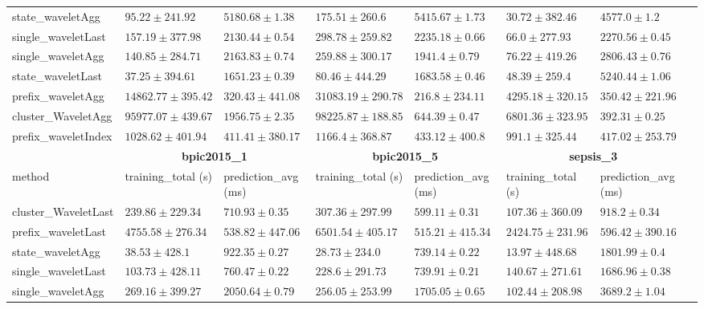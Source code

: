 \documentclass[twoside,11pt]{Latex/Classes/PhDthesisPSnPDF}
\begin{document}
\begin{table}[h]
{\begin{tabular}{llllllll}
	state\_waveletAgg & $95.22 \pm 241.92$ & $5180.68 \pm 1.38$ & $175.51 \pm 260.6$ & $5415.67 \pm 1.73$ & $\mathbf{30.72 \pm 382.46}$ & $4577.0 \pm 1.2$ \\ 
	single\_waveletLast & $157.19 \pm 377.98$ & $2130.44 \pm 0.54$ & $298.78 \pm 259.82$ & $2235.18 \pm 0.66$ & $66.0 \pm 277.93$ & $2270.56 \pm 0.45$ \\ 
	single\_waveletAgg & $140.85 \pm 284.71$ & $2163.83 \pm 0.74$ & $259.88 \pm 300.17$ & $1941.4 \pm 0.79$ & $76.22 \pm 419.26$ & $2806.43 \pm 0.76$ \\ 
	state\_waveletLast & $\mathbf{37.25 \pm 394.61}$ & $1651.23 \pm 0.39$ & $\mathbf{80.46 \pm 444.29}$ & $1683.58 \pm 0.46$ & $48.39 \pm 259.4$ & $5240.44 \pm 1.06$ \\ 
	prefix\_waveletAgg & $14862.77 \pm 395.42$ & $\mathbf{320.43 \pm 441.08}$ & $31083.19 \pm 290.78$ & $\mathbf{216.8 \pm 234.11}$ & $4295.18 \pm 320.15$ & $350.42 \pm 221.96$ \\ 
	cluster\_WaveletAgg & $95977.07 \pm 439.67$ & $1956.75 \pm 2.35$ & $98225.87 \pm 188.85$ & $644.39 \pm 0.47$ & $6801.36 \pm 323.95$ & $392.31 \pm 0.25$ \\ 
	prefix\_waveletIndex & $1028.62 \pm 401.94$ & $411.41 \pm 380.17$ & $1166.4 \pm 368.87$ & $433.12 \pm 400.8$ & $991.1 \pm 325.44$ & $417.02 \pm 253.79$ \\ 
	\bottomrule
	\toprule
	& \multicolumn{2}{c}{{\bfseries bpic2015\_1}} & \multicolumn{2}{c}{{\bfseries bpic2015\_5}} & \multicolumn{2}{c}{{\bfseries sepsis\_3}} \\ \cmidrule(lr){2-3} \cmidrule(lr){4-5} \cmidrule(lr){6-7}
	method  & training\_total (s) & prediction\_avg (ms) & training\_total (s) & prediction\_avg (ms) & training\_total (s) & prediction\_avg (ms) \\ \midrule
	cluster\_WaveletLast & $239.86 \pm 229.34$ & $710.93 \pm 0.35$ & $307.36 \pm 297.99$ & $599.11 \pm 0.31$ & $107.36 \pm 360.09$ & $918.2 \pm 0.34$ \\ 
	prefix\_waveletLast & $4755.58 \pm 276.34$ & $538.82 \pm 447.06$ & $6501.54 \pm 405.17$ & $515.21 \pm 415.34$ & $2424.75 \pm 231.96$ & $596.42 \pm 390.16$ \\ 
	state\_waveletAgg & $\mathbf{38.53 \pm 428.1}$ & $922.35 \pm 0.27$ & $\mathbf{28.73 \pm 234.0}$ & $739.14 \pm 0.22$ & $\mathbf{13.97 \pm 448.68}$ & $1801.99 \pm 0.4$ \\ 
	single\_waveletLast & $103.73 \pm 428.11$ & $760.47 \pm 0.22$ & $228.6 \pm 291.73$ & $739.91 \pm 0.21$ & $140.67 \pm 271.61$ & $1686.96 \pm 0.38$ \\ 
	single\_waveletAgg & $269.16 \pm 399.27$ & $2050.64 \pm 0.79$ & $256.05 \pm 253.99$ & $1705.05 \pm 0.65$ & $102.44 \pm 208.98$ & $3689.2 \pm 1.04$ \\ 
	

\end{tabular}}
\end{table}
\end{document}
